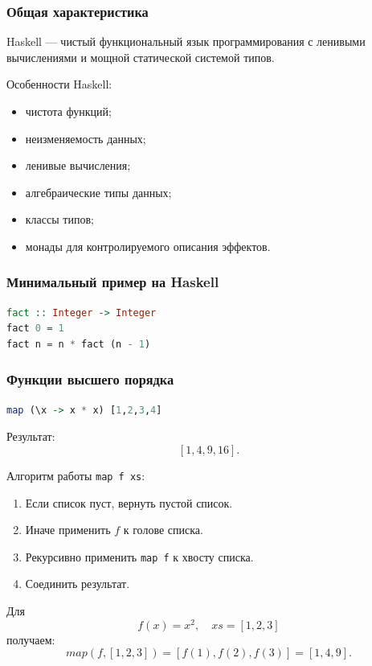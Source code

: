 \documentclass[12pt,a4paper]{article}
\begin{document}
\subsubsection{Общая характеристика}

Haskell --- чистый функциональный язык программирования с ленивыми вычислениями и мощной статической системой типов.

Особенности Haskell:
\begin{itemize}
    \item чистота функций;
    \item неизменяемость данных;
    \item ленивые вычисления;
    \item алгебраические типы данных;
    \item классы типов;
    \item монады для контролируемого описания эффектов.
\end{itemize}

\subsubsection{Минимальный пример на Haskell}

\begin{lstlisting}[language=Haskell]
fact :: Integer -> Integer
fact 0 = 1
fact n = n * fact (n - 1)
\end{lstlisting}

\subsubsection{Функции высшего порядка}

\begin{lstlisting}[language=Haskell]
map (\x -> x * x) [1,2,3,4]
\end{lstlisting}

Результат:
$$
[1,4,9,16].
$$

Алгоритм работы \texttt{map f xs}:
\begin{enumerate}
    \item Если список пуст, вернуть пустой список.
    \item Иначе применить $f$ к голове списка.
    \item Рекурсивно применить \texttt{map f} к хвосту списка.
    \item Соединить результат.
\end{enumerate}

Для
$$
f(x)=x^2,\quad xs=[1,2,3]
$$
получаем:
$$
map(f,[1,2,3])
=
[f(1),f(2),f(3)]
=
[1,4,9].
$$
\end{document}
